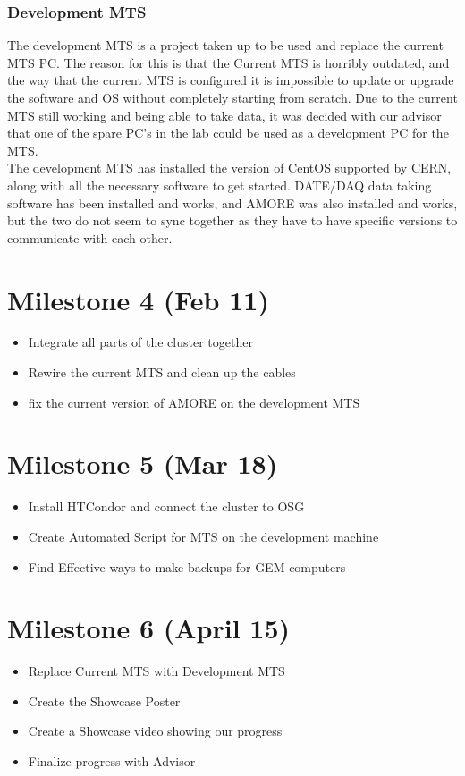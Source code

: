 \documentclass[12pt]{article}
\newcommand\tab[1][1cm]{\hspace*{#1}}
\begin{document}
\subsubsection{Development MTS}
\tab The development MTS is a project taken up to be used and replace the current MTS PC. The reason for this is that the Current MTS is horribly outdated, and the way that the current MTS is configured it is impossible to update or upgrade the software and OS without completely starting from scratch. Due to the current MTS still working and being able to take data, it was decided with our advisor that one of the spare PC's in the lab could be used as a development PC for the MTS. \\
\tab The development MTS has installed the version of CentOS supported by CERN, along with all the necessary software to get started. DATE/DAQ data taking software has been installed and works, and AMORE was also installed and works, but the two do not seem to sync together as they have to have specific versions to communicate with each other.


\section{Milestone 4 (Feb 11)}
\begin{itemize}
	\item Integrate all parts of the cluster together
	\item Rewire the current MTS and clean up the cables 
	\item fix the current version of AMORE on the development MTS
\end{itemize}

\section{Milestone 5 (Mar 18)}
\begin{itemize}
	\item Install HTCondor and connect the cluster to OSG
	\item Create Automated Script for MTS on the development machine
	\item Find Effective ways to make backups for GEM computers
\end{itemize}

\section{Milestone 6 (April 15)}
\begin{itemize}
	\item Replace Current MTS with Development MTS
	\item Create the Showcase Poster
	\item Create a Showcase video showing our progress
	\item Finalize progress with Advisor
\end{itemize}
\end{document}
